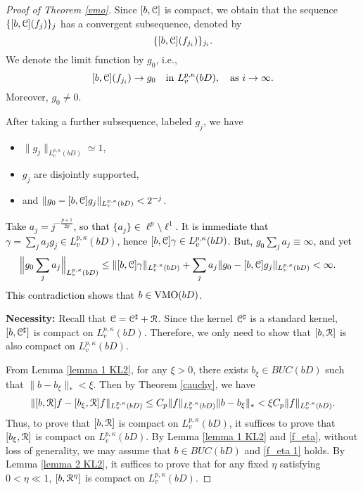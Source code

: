 \documentclass[11pt,a4paper]{amsart}
\numberwithin{equation}{section}
\begin{document}
{\begin{proof}[Proof of   Theorem \ref{vmo}]
Since $[b, \EuScript C]$ is compact, we obtain that the  sequence
$ \{[b, \EuScript C](f_j)\}_j $
has a convergent subsequence, denoted by
$$ \{[b, \EuScript C](f_{j_i})\}_{j_i}. $$
We denote the limit function by $g_0$, i.e.,
$$ [b, \EuScript C](f_{j_i})\to g_0 \quad{\rm in\ }  L_v^{p,\kappa}(bD), \quad{\rm as\ } i\to\infty.$$
Moreover,  $g_{0} \neq 0$.

After taking a further subsequence, labeled $g_{j}$, we have
\begin{itemize}
\item  $\lVert g_{j} \rVert _{L_v^{p,\kappa}(bD)}  \simeq 1$,
\item  $g_{j}$ are disjointly supported,
\item and $\lVert g_{0}  -  [b, \EuScript C] g_{j} \rVert _{L_v^{p,\kappa}(bD)}  < 2^{-j}$.
\end{itemize}

\textcolor{black}{
Take $a_{j } = j ^{ -\frac {p+1}{2p}}$, so that $ \{a_{j}\} \in \ell^{p} \setminus \ell^{1}$.   It is immediate that $ \gamma = \sum_{j} a_{j} g_{j} \in
L_v^{p,\kappa}(bD)$, hence $ [b, \EuScript C] \gamma \in L_v^{p,\kappa}(bD)$.  But, $ g_{0} \sum_{j} a_{j} \equiv \infty$, and yet
 \begin{align*}
\Bigl\lVert  g_{0} \sum_{j} a_{j} \Bigr\rVert _{L_v^{p,\kappa}(bD)}
& \leq \lVert  [b, \EuScript C] \gamma  \rVert _{L_v^{p,\kappa}(bD)}
+ \sum_{j} a_{j}  \lVert   g_{0} -  [b, \EuScript C] g_{j}  \rVert _{L_v^{p,\kappa}(bD)}  < \infty.
\end{align*}
This contradiction shows that $b\in {\rm VMO}(bD)$.
}






\smallskip

{\bf Necessity:}
Recall that $\EuScript C=\EuScript C^\sharp+\EuScript R$. Since the kernel $\EuScript C^\sharp$ is a standard kernel,  $[b, \EuScript C^\sharp]$ is compact on $L_v^{p,\kappa}(bD)$. Therefore, we only need to show that $[b, \EuScript R]$ is also compact on
$L_v^{p,\kappa}(bD)$.



From Lemma \ref {lemma 1 KL2}, for any $\xi>0$, there exists $b_\xi\in BUC(bD)$ such that
$\|b-b_\xi\|_*<\xi$. Then
by Theorem \ref{cauchy}, we have
\begin{align*}
\|[b, \EuScript R]f-[b_\xi, \EuScript R]f\|_{L_v^{p,\kappa}(bD)}\leq C_p\|f\|_{L_v^{p,\kappa}(bD)}\|b-b_\xi\|_*
<\xi C_p\|f\|_{L_v^{p,\kappa}(bD)}.
\end{align*}
Thus, to prove that $[b, \EuScript R]$ is compact on $L_v^{p,\kappa}(bD)$, it suffices to prove that $[b_\xi, \EuScript R]$ is compact on $L_v^{p,\kappa}(bD)$.
By Lemma \ref {lemma 1 KL2} and \eqref {f_eta}, without loss of generality, we may assume that $b\in BUC(bD)$ and \eqref {f_eta 1} holds.
By Lemma \ref {lemma 2 KL2}, it suffices to prove that for any fixed $\eta$ satisfying $0<\eta \ll 1$,  $[b, \EuScript R^\eta]$ is compact on $L_v^{p,\kappa}(bD)$.



\end{proof}}
\end{document}
